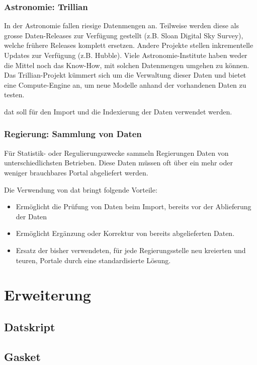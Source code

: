 \subsection{Astronomie: Trillian} %
In der Astronomie fallen riesige Datenmengen an. Teilweise werden diese als grosse Daten-Releases zur Verfügung gestellt (z.B. Sloan Digital Sky Survey), welche frühere Releases komplett ersetzen. Andere Projekte stellen inkrementelle Updates zur Verfügung (z.B. Hubble). Viele Astronomie-Institute haben weder die Mittel noch das Know-How, mit solchen Datenmengen umgehen zu können. Das Trillian-Projekt kümmert sich um die Verwaltung dieser Daten und bietet eine Compute-Engine an, um neue Modelle anhand der vorhandenen Daten zu testen.

dat soll für den Import und die Indexierung der Daten verwendet werden.

\subsection{Regierung: Sammlung von Daten} %
Für Statistik- oder Regulierungszwecke sammeln Regierungen Daten von unterschiedlichsten Betrieben. Diese Daten müssen oft über ein mehr oder weniger brauchbares Portal abgeliefert werden.

Die Verwendung von dat bringt folgende Vorteile:
\begin{itemize}
\item Ermöglicht die Prüfung von Daten beim Import, bereits vor der Ablieferung der Daten
\item Ermöglicht Ergänzung oder Korrektur von bereits abgelieferten Daten.
\item Ersatz der bisher verwendeten, für jede Regierungsstelle neu kreierten und teuren, Portale durch eine standardisierte Lösung.
\end{itemize}

\chapter{Erweiterung}

\section{Datskript}

\section{Gasket}

